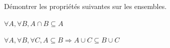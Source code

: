 
\begingroup

\begin{exercice}\label{exo:introduction/maths/set_proofs}

  Démontrer les propriétés suivantes sur les ensembles. 
  \begin{questions}
  \item $\forall A, \forall B, A\cap B \subseteq A$
  \item $\forall A, \forall B, \forall C, A\subseteq B \Rightarrow A\cup C \subseteq B \cup C$
  \end{questions}

\end{exercice}

